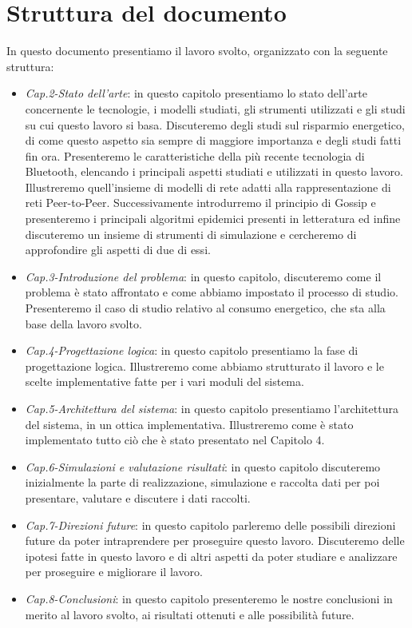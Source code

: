 \section{Struttura del documento}
In questo documento presentiamo il lavoro svolto, organizzato con la seguente struttura:
\begin{itemize}
	\item \textit{Cap.2-Stato dell'arte}: in questo capitolo presentiamo lo stato dell'arte concernente le tecnologie, i modelli studiati, gli strumenti utilizzati e gli studi su cui questo lavoro si basa. Discuteremo degli studi sul risparmio energetico, di come questo aspetto sia sempre di maggiore importanza e degli studi fatti fin ora. Presenteremo le caratteristiche della più recente tecnologia di Bluetooth, elencando i principali aspetti studiati e utilizzati in questo lavoro. Illustreremo quell'insieme di modelli di rete adatti alla rappresentazione di reti Peer-to-Peer. Successivamente introdurremo il principio di Gossip e presenteremo i principali algoritmi epidemici presenti in letteratura ed infine discuteremo un insieme di strumenti di simulazione e cercheremo di approfondire gli aspetti di due di essi.
	\item \textit{Cap.3-Introduzione del problema}: in questo capitolo, discuteremo come il problema è stato affrontato e come abbiamo impostato il processo di studio. Presenteremo il caso di studio relativo al consumo energetico, che sta alla base della lavoro svolto.
	\item \textit{Cap.4-Progettazione logica}: in questo capitolo presentiamo la fase di progettazione logica. Illustreremo come abbiamo strutturato il lavoro e le scelte implementative fatte per i vari moduli del sistema.
	\item \textit{Cap.5-Architettura del sistema}: in questo capitolo presentiamo l'architettura del sistema, in un ottica implementativa. Illustreremo come è stato implementato tutto ciò che è stato presentato nel Capitolo 4.
	\item \textit{Cap.6-Simulazioni e valutazione risultati}: in questo capitolo discuteremo inizialmente la parte di realizzazione, simulazione e raccolta dati per poi presentare, valutare e discutere i dati raccolti.
	\item \textit{Cap.7-Direzioni future}: in questo capitolo parleremo delle possibili direzioni future da poter intraprendere per proseguire questo lavoro. Discuteremo delle ipotesi fatte in questo lavoro e di altri aspetti da poter studiare e analizzare per proseguire e migliorare il lavoro.
	\item \textit{Cap.8-Conclusioni}: in questo capitolo presenteremo le nostre conclusioni in merito al lavoro svolto, ai risultati ottenuti e alle possibilità future.
\end{itemize}